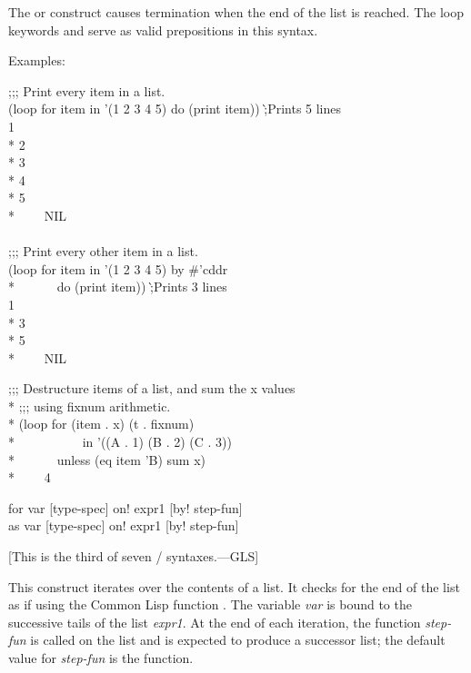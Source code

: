 \begin{new}
\begin{defloop}
The  or  construct causes termination when the
end of the list is reached.
The loop keywords  and  serve as valid prepositions in
this syntax.

Examples:
\begin{lisp}
;;; Print every item in a list. \\[3pt]
(loop for item in '(1 2 3 4 5) do (print item)) \`;{\rm Prints 5 lines} \\
1 \\*
2 \\*
3 \\*
4 \\*
5 \\*
~~~\EV~NIL \\
 \\
;;; Print every other item in a list. \\[3pt]
(loop for item in '(1 2 3 4 5) by \#'cddr \\*
~~~~~~do (print item))  \`;{\rm Prints 3 lines} \\
1 \\*
3 \\*
5 \\*
~~~\EV~NIL
\end{lisp}
\begin{lisp}
;;; Destructure items of a list, and sum the x values \\*
;;; using fixnum arithmetic. \\*
(loop for (item . x) (t . fixnum) \\*
~~~~~~~~~~in '((A . 1) (B . 2) (C . 3)) \\*
~~~~~~unless (eq item 'B) sum x) \\*
~~~\EV~4
\end{lisp}
\end{defloop}

\begin{defloop}
for var [type-spec] \!on! expr1 [\!by! step-fun] \\
as var [type-spec] \!on! expr1 [\!by! step-fun]

[This is the third of seven / syntaxes.---GLS]

This construct iterates over the contents of a list. It checks for the
end of the list as if using the Common Lisp function 
.  
The variable {\it var\/} is bound to the successive tails of the list
{\it expr1}.  At the end of each iteration, the function {\it step-fun\/}
is called on the list and is expected to produce a successor list;
the default value for {\it step-fun\/} is the  function.


\end{defloop}
\end{new}
